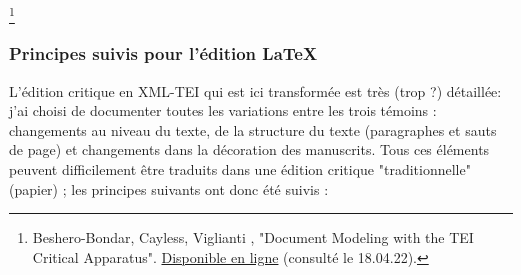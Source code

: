 \documentclass[12pt, a4paper]{article}
\begin{document}
          \footnote{
                Beshero-Bondar, Cayless, Viglianti
              , "Document Modeling with the TEI Critical Apparatus". \href{http://bit.ly/crit-app-panel}{Disponible en ligne} (consulté le 18.04.22).}
                \subsubsection{Principes suivis pour l'édition \LaTeX}
                
            L'édition critique en XML-TEI qui est ici transformée est très (trop ?) 
            détaillée: j'ai choisi de documenter toutes les variations entre les trois 
            témoins : changements au niveau du texte, de la structure du texte 
            (paragraphes et sauts de page) et changements dans la décoration des 
            manuscrits. Tous ces éléments peuvent difficilement être traduits 
            dans une édition critique "traditionnelle" (papier) ; les principes 
            suivants ont donc été suivis :
\end{document}
